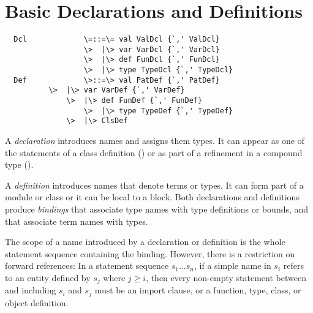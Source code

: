 \documentclass[11pt]{report}
\begin{document}
\chapter{Basic Declarations and Definitions}
\label{sec:defs}

\syntax\begin{verbatim}
  Dcl             \=::=\= val ValDcl {`,' ValDcl}
                  \>  |\> var VarDcl {`,' VarDcl}
                  \>  |\> def FunDcl {`,' FunDcl}
                  \>  |\> type TypeDcl {`,' TypeDcl}
  Def             \>::=\> val PatDef {`,' PatDef}
		  \>  |\> var VarDef {`,' VarDef}
  	          \>  |\> def FunDef {`,' FunDef}
                  \>  |\> type TypeDef {`,' TypeDef}
	          \>  |\> ClsDef
\end{verbatim}

A {\em declaration} introduces names and assigns them types. It can
appear as one of the statements of a class definition
() or as part of a refinement in a compound
type ().

A {\em definition} introduces names
that denote terms or types. It can form part of a module or class or
it can be local to a block.  Both declarations and definitions produce
{\em bindings} that associate type names with type definitions or
bounds, and that associate term names with types.

The scope of a name introduced by a declaration or definition is the
whole statement sequence containing the binding.  However, there is a
restriction on forward references: In a statement sequence $s_1 \ldots
s_n$, if a simple name in $s_i$ refers to an entity defined by $s_j$
where $j \geq i$, then every non-empty statement between and including
$s_i$ and $s_j$ must be an import clause,
or a function, type, class, or object definition.

\end{document}
